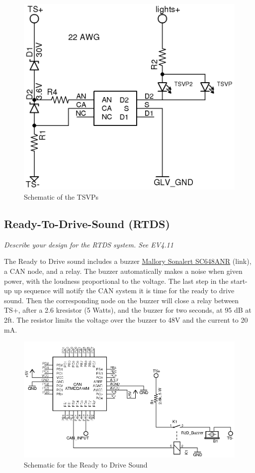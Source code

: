 \documentclass{article}
\begin{document}
\begin{figure}[H]
    \centering
    \includegraphics[width = 0.5 \textwidth]{tsvp_fh}
    \caption{Schematic of the TSVPs}
    \label{tsvpschem}
\end{figure}

\subsection{Ready-To-Drive-Sound (RTDS)}

\textit{Describe your design for the RTDS system. See EV4.11}

The Ready to Drive sound includes a buzzer \href{http://www.mouser.com/ProductDetail/Mallory-Sonalert/SC648ANR/?qs=sGAEpiMZZMsK322k1rNFfUHVVB8ZIcIhitNEhItROC4\%3d}{Mallory Sonalert SC648ANR} (link), a CAN node, and a relay. The buzzer automatically makes a noise when given power, with the loudness proportional to the voltage. The last step in the start-up up sequence will notify the CAN system it is time for the ready to drive sound. Then the corresponding node on the buzzer will close a relay between TS+, after a 2.6 k\ohm resistor (5 Watts), and the buzzer for two seconds, at 95 dB at 2ft. The resistor limits the voltage over the buzzer to 48V and the current to 20 mA.

\begin{figure}[H]
    \centering
    \includegraphics{R2Dsoundbuzzerschem}
    \caption{Schematic for the Ready to Drive Sound}
    \label{r2dschem}
\end{figure}
\end{document}
